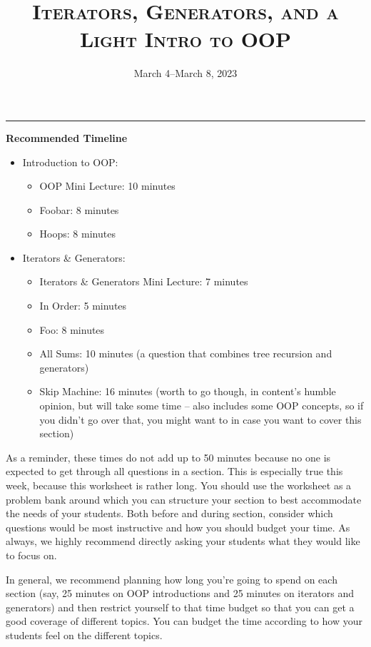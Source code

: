 \documentclass{exam}
\title{\textsc{Iterators, Generators, and a Light Intro to OOP}}
\date{March 4--March 8, 2023}
\begin{document}
\maketitle
\rule{\textwidth}{0.15em}


\begin{guide}
    \textbf{Recommended Timeline}
    \begin{itemize}
        \item Introduction to OOP:
        \begin{itemize}
            \item OOP Mini Lecture: 10 minutes
            \item Foobar: 8 minutes
            \item Hoops: 8 minutes
        \end{itemize}
        \item Iterators \& Generators:
        \begin{itemize}
            \item Iterators \& Generators Mini Lecture: 7 minutes
            \item In Order: 5 minutes
            \item Foo: 8 minutes
            \item All Sums: 10 minutes (a question that combines tree recursion and generators)
            \item Skip Machine: 16 minutes (worth to go though, in content's humble opinion, but will take some time -- also includes some OOP concepts, so if you didn't go over that, you might want to in case you want to cover this section)
        \end{itemize}
    \end{itemize}

    As a reminder, these times do not add up to 50 minutes because no one is expected 
    to get through all questions in a section. This is especially true this week, 
    because this worksheet is rather long. You should use the worksheet as a problem bank
     around which you can structure your section to best accommodate the needs of your 
     students. Both before and during section, consider which questions would be most 
     instructive and how you should budget your time. As always, we highly recommend directly asking your students what they would like to focus on.
     
    In general, we recommend planning how long you're going to spend on each section (say, 25 minutes on OOP introductions and 25 minutes on iterators and generators)
    and then restrict yourself to that time budget so that you can get a good coverage of different topics. You can budget the time according to how your students feel on the different topics.
\end{guide}
\end{document}

